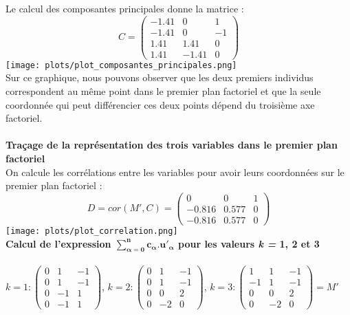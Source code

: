 \documentclass[a4paper, 10pt]{article}
\begin{document}
Le calcul des composantes principales donne la matrice :\\
\[C =
\begin{pmatrix}
-1.41 & 0 & 1\\
-1.41 & 0 & -1\\
1.41 & 1.41 & 0\\
1.41 & -1.41 & 0
\end{pmatrix}\]
\texttt{[image: plots/plot\_composantes\_principales.png]}\\
Sur ce graphique, nous pouvons observer que les deux premiers individus correspondent au m\^eme point dans le premier plan factoriel
et que la seule coordonn\'ee qui peut diff\'erencier ces deux points d\'epend du troisi\`eme axe factoriel.\\ \\
\textbf{Traçage de la repr\'esentation des trois variables dans le premier plan factoriel}\\
On calcule les corr\'elations entre les variables pour avoir leurs coordonn\'ees sur le premier plan factoriel :\\
\[D = cor(M', C) =
\begin{pmatrix}
0 & 0 & 1\\
-0.816 & 0.577 & 0\\
-0.816 & 0.577 & 0
\end{pmatrix}\]
\texttt{[image: plots/plot\_correlation.png]}\\
\textbf{Calcul de l'expression $\mathbf{\sum_{\alpha=0}^n c_{\alpha}.u'_{\alpha}}$ pour les valeurs \textit{k =} 1, 2 et 3}\\ \\
$k = 1 :
\begin{pmatrix}
0 & 1 & -1\\
0 & 1 & -1\\
0 & -1 & 1\\
0 & -1 & 1
\end{pmatrix}$,
$k = 2 :
\begin{pmatrix}
0 & 1 & -1\\
0 & 1 & -1\\
0 & 0 & 2\\
0 & -2 & 0
\end{pmatrix}$,
$k = 3 :
\begin{pmatrix}
1 & 1 & -1\\
-1 & 1 & -1\\
0 & 0 & 2\\
0 & -2 & 0
\end{pmatrix} = M'$\newpage
\end{document}
